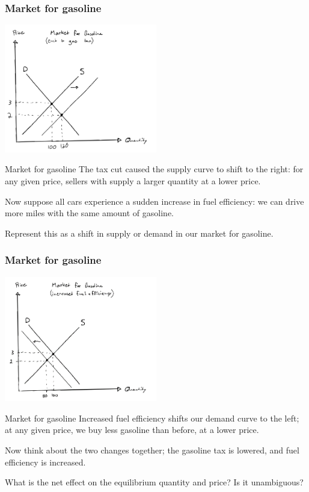 \documentclass[aspectratio=169]{beamer}
\begin{document}
\begin{frame}
    \frametitle{Market for gasoline}
    \centering
    \includegraphics[width = 0.5\textwidth,keepaspectratio]{tax_cut.png}
\end{frame}

\begin{frame}{Market for gasoline}
    The tax cut caused the supply curve to shift to the right: for any given price, sellers with supply a larger quantity at a lower price.

    \medskip

    Now suppose all cars experience a sudden increase in fuel efficiency: we can drive more miles with the same amount of gasoline.

    \medskip

    Represent this as a shift in supply or demand in our market for gasoline.
\end{frame}

\begin{frame}
    \frametitle{Market for gasoline}
    \centering
    \includegraphics[width = 0.5\textwidth,keepaspectratio]{increase_efficiency.png}
\end{frame}

\begin{frame}{Market for gasoline}
    Increased fuel efficiency shifts our demand curve to the left; at any given price, we buy less gasoline than before, at a lower price.

    \medskip

    Now think about the two changes together; the gasoline tax is lowered, and fuel efficiency is increased. 
    
    \medskip

    What is the net effect on the equilibrium quantity and price? Is it unambiguous?
\end{frame}
\end{document}
